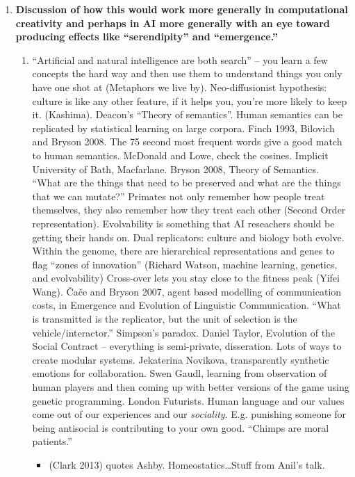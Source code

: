 \begin{mdframed}
\begin{enumerate}[start=4]
\item \textbf{Discussion of how this would work more generally in
  computational creativity and perhaps in AI more generally with an
  eye toward producing effects like ``serendipity'' and
  ``emergence.''}
\begin{enumerate}
\item ``Artificial and natural intelligence are both search'' -- you learn a few concepts the hard way and then use them to understand things you only have one shot at (Metaphors we live by).  Neo-diffusionist hypothesis: culture is like any other feature, if it helps you, you're more likely to keep it.  (Kashima).  Deacon's ``Theory of semantics''.  Human semantics can be replicated by statistical learning on large corpora.  Finch 1993, Bilovich and Bryson 2008.  The 75 second most frequent words give a good match to human semantics.  McDonald and Lowe, check the cosines.  Implicit University of Bath, Macfarlane.  Bryson 2008, Theory of Semantics.  ``What are the things that need to be preserved and what are the things that we can mutate?''  Primates not only remember how people treat themselves, they also remember how they treat each other (Second Order representation).  Evolvability is something that AI reseachers should be getting their hands on.  Dual replicators: culture and biology both evolve.  Within the genome, there are hierarchical representations and genes to flag ``zones of innovation'' (Richard Watson, machine learning, genetics, and evolvability)  Cross-over lets you stay close to the fitness peak (Yifei Wang).  \v{C}a\v{c}e and Bryson 2007, agent based modelling of communication costs, in Emergence and Evolution of Linguistic Communication.  ``What is transmitted is the replicator, but the unit of selection is the vehicle/interactor.''  Simpson's paradox.  Daniel Taylor, Evolution of the Social Contract -- everything is semi-private, disseration.  Lots of ways to create modular systems.  Jekaterina Novikova, transparently synthetic emotions for collaboration.  Swen Gaudl, learning from observation of human players and then coming up with better versions of the game using genetic programming.  London Futurists.  Human language and our values come out of our experiences and our \emph{sociality}.  E.g. punishing someone for being antisocial is contributing to your own good.  ``Chimps are moral patients.''
\begin{itemize}
\item (Clark 2013) quotes Ashby.  Homeostatics\ldots Stuff from Anil's talk.

\end{itemize}
\end{enumerate}
\end{enumerate}
\end{mdframed}

